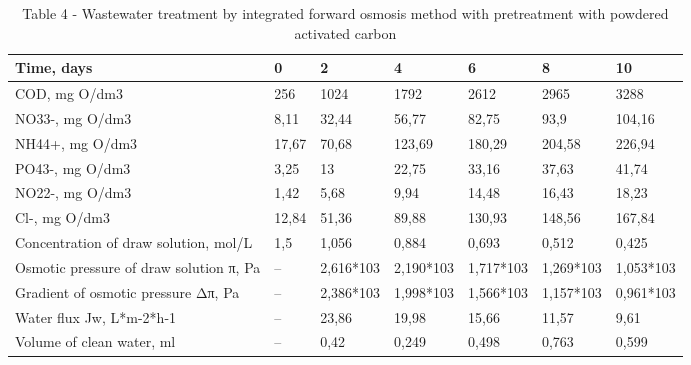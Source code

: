 \begin{table}[H]
\caption*{Table 4 - Wastewater treatment by integrated forward osmosis method with pretreatment with powdered activated carbon}
\centering
\begin{tabular}{|p{}|l|l|l|l|l|l|}
\hline
Time, days                & 0     & 2     & 4      & 6      & 8      & 10     \\ \hline
COD, mg O/dm3             & 256   & 1024  & 1792   & 2612   & 2965   & 3288   \\ \hline
NO33-, mg O/dm3           & 8,11  & 32,44 & 56,77  & 82,75  & 93,9   & 104,16 \\ \hline
NH44+, mg O/dm3           & 17,67 & 70,68 & 123,69 & 180,29 & 204,58 & 226,94 \\ \hline
PO43-, mg O/dm3           & 3,25  & 13    & 22,75  & 33,16  & 37,63  & 41,74  \\ \hline
NO22-, mg O/dm3           & 1,42  & 5,68  & 9,94   & 14,48  & 16,43  & 18,23  \\ \hline
Cl-, mg O/dm3             & 12,84 & 51,36 & 89,88  & 130,93 & 148,56 & 167,84 \\ \hline
Concentration of draw solution, mol/L   & 1,5 & 1,056     & 0,884     & 0,693     & 0,512     & 0,425     \\ \hline
Osmotic pressure of draw solution π, Pa & –   & 2,616*103 & 2,190*103 & 1,717*103 & 1,269*103 & 1,053*103 \\ \hline
Gradient of osmotic pressure Δπ, Pa     & –   & 2,386*103 & 1,998*103 & 1,566*103 & 1,157*103 & 0,961*103 \\ \hline
Water flux Jw, L*m-2*h-1  & –     & 23,86 & 19,98  & 15,66  & 11,57  & 9,61   \\ \hline
Volume of clean water, ml & –     & 0,42  & 0,249  & 0,498  & 0,763  & 0,599  \\ \hline
\end{tabular}
\end{table}

